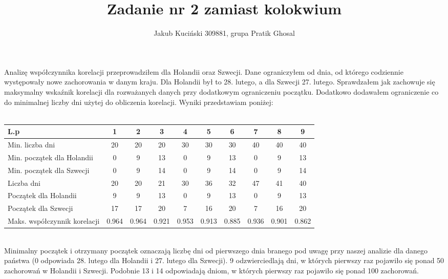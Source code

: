 \documentclass[a4paper,12pt] {article}
\title{Zadanie nr 2 zamiast kolokwium}
\author{Jakub Kuciński 309881, grupa Pratik Ghosal}
\begin{document}
\maketitle
\thispagestyle{empty}

Analizę współczynnika korelacji przeprowadziłem dla Holandii oraz Szwecji. Dane ograniczyłem od dnia, od którego codziennie występowały nowe zachorowania w danym kraju. Dla Holandii był to 28. lutego, a dla Szwecji 27. lutego. Sprawdzałem jak zachowuje się maksymalny wskaźnik korelacji dla rozważanych danych przy dodatkowym ograniczeniu początku. Dodatkowo dodawałem ograniczenie co do minimalnej liczby dni użytej do obliczenia korelacji. Wyniki przedstawiam poniżej:\\\\
\begin{tabular}{| l | c | c | c | c | c | c | c | c | c |}
\hline
L.p & 1 & 2 & 3 & 4 & 5 & 6 & 7 & 8 & 9\\ 
\hline
Min. liczba dni & 20 & 20 & 20 & 30 & 30 & 30 & 40 & 40 & 40\\
\hline
Min. początek dla Holandii & 0 & 9 & 13 & 0 & 9 & 13 & 0 & 9 & 13\\
\hline
Min. początek dla Szwecji & 0 & 9 & 14 & 0 & 9 & 14 & 0 & 9 & 14\\
\hline
Liczba dni & 20 & 20 & 21 & 30 & 36 & 32 & 47 & 41 & 40\\
\hline
Początek dla Holandii & 9 & 9 & 13 & 0 & 9 & 13 & 0 & 9 & 13\\
\hline
Początek dla Szwecji & 17 & 17 & 20 & 7 & 16 & 20 & 7 & 16 & 20\\
\hline
Maks. współczynnik korelacji & 0.964 & 0.964 & 0.921 & 0.953 & 0.913 & 0.885 & 0.936 & 0.901 & 0.862\\
\hline
\end{tabular}\\

Minimalny początek i otrzymany początek oznaczają liczbę dni od pierwszego dnia branego pod uwagę przy naszej analizie dla danego państwa (0 odpowiada 28. lutego dla Holandii i 27. lutego dla Szwecji). 9 odzwierciedlają dni, w których pierwszy raz pojawiło się ponad 50 zachorowań w Holandii i Szwecji. Podobnie 13 i 14 odpowiadają dniom, w których pierwszy raz pojawiło się ponad 100 zachorowań. \\
\end{document}
